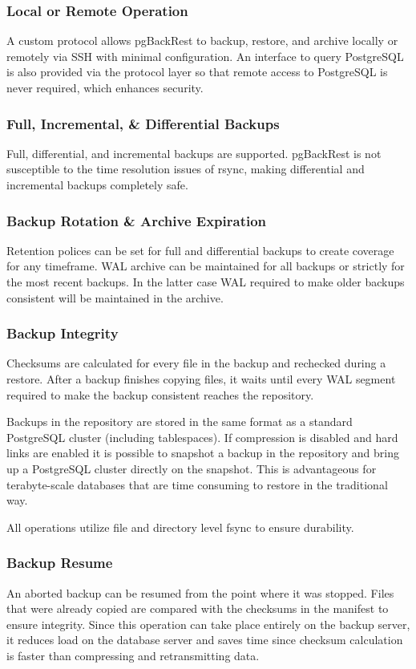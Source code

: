 \documentclass[hyperref={pdfpagelabels=false}]{beamer}
\begin{document}
    \begin{frame}
        \frametitle{Local or Remote Operation}

        A custom protocol allows pgBackRest to backup, restore, and archive locally or remotely via SSH with minimal configuration. An interface to query PostgreSQL is also provided via the protocol layer so that remote access to PostgreSQL is never required, which enhances security.
    \end{frame}

    \begin{frame}
        \frametitle{Full, Incremental, \& Differential Backups}

        Full, differential, and incremental backups are supported. pgBackRest is not susceptible to the time resolution issues of rsync, making differential and incremental backups completely safe.
    \end{frame}

    \begin{frame}
        \frametitle{Backup Rotation \& Archive Expiration}

        Retention polices can be set for full and differential backups to create coverage for any timeframe. WAL archive can be maintained for all backups or strictly for the most recent backups. In the latter case WAL required to make older backups consistent will be maintained in the archive.
    \end{frame}

    \begin{frame}
        \frametitle{Backup Integrity}

        Checksums are calculated for every file in the backup and rechecked during a restore. After a backup finishes copying files, it waits until every WAL segment required to make the backup consistent reaches the repository.
        \par
        Backups in the repository are stored in the same format as a standard PostgreSQL cluster (including tablespaces). If compression is disabled and hard links are enabled it is possible to snapshot a backup in the repository and bring up a PostgreSQL cluster directly on the snapshot. This is advantageous for terabyte-scale databases that are time consuming to restore in the traditional way.
        \par
        All operations utilize file and directory level fsync to ensure durability.
    \end{frame}

    \begin{frame}
        \frametitle{Backup Resume}

        An aborted backup can be resumed from the point where it was stopped. Files that were already copied are compared with the checksums in the manifest to ensure integrity. Since this operation can take place entirely on the backup server, it reduces load on the database server and saves time since checksum calculation is faster than compressing and retransmitting data.
    \end{frame}
\end{document}
